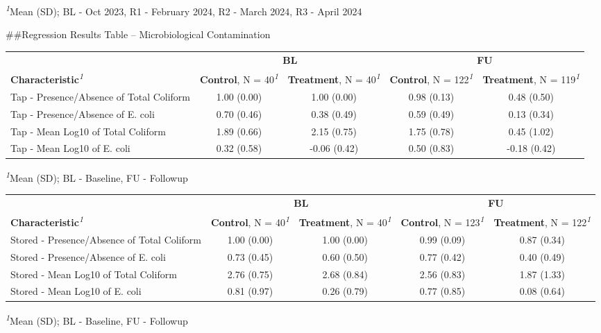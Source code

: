 \documentclass[
]{article}
\begin{document}
\begin{minipage}{\linewidth}
\textsuperscript{\textit{1}}Mean (SD); BL - Oct 2023, R1 - February 2024, R2 - March 2024, R3 - April 2024\\
\end{minipage}

\#\#Regression Results Table -- Microbiological Contamination

\setlength{\LTpost}{0mm}
\begin{longtable}{lcccc}
\toprule
 & \multicolumn{2}{c}{\textbf{BL}} & \multicolumn{2}{c}{\textbf{FU}} \\ 
\cmidrule(lr){2-3} \cmidrule(lr){4-5}
\textbf{Characteristic}\textsuperscript{\textit{1}} & \textbf{Control}, N = 40\textsuperscript{\textit{1}} & \textbf{Treatment}, N = 40\textsuperscript{\textit{1}} & \textbf{Control}, N = 122\textsuperscript{\textit{1}} & \textbf{Treatment}, N = 119\textsuperscript{\textit{1}} \\ 
\midrule\addlinespace[2.5pt]
Tap - Presence/Absence of Total Coliform & 1.00 (0.00) & 1.00 (0.00) & 0.98 (0.13) & 0.48 (0.50) \\ 
Tap - Presence/Absence of E. coli & 0.70 (0.46) & 0.38 (0.49) & 0.59 (0.49) & 0.13 (0.34) \\ 
Tap - Mean Log10 of Total Coliform & 1.89 (0.66) & 2.15 (0.75) & 1.75 (0.78) & 0.45 (1.02) \\ 
Tap - Mean Log10 of E. coli & 0.32 (0.58) & -0.06 (0.42) & 0.50 (0.83) & -0.18 (0.42) \\ 
\bottomrule
\end{longtable}
\begin{minipage}{\linewidth}
\textsuperscript{\textit{1}}Mean (SD); BL - Baseline, FU - Followup\\
\end{minipage}
\setlength{\LTpost}{0mm}
\begin{longtable}{lcccc}
\toprule
 & \multicolumn{2}{c}{\textbf{BL}} & \multicolumn{2}{c}{\textbf{FU}} \\ 
\cmidrule(lr){2-3} \cmidrule(lr){4-5}
\textbf{Characteristic}\textsuperscript{\textit{1}} & \textbf{Control}, N = 40\textsuperscript{\textit{1}} & \textbf{Treatment}, N = 40\textsuperscript{\textit{1}} & \textbf{Control}, N = 123\textsuperscript{\textit{1}} & \textbf{Treatment}, N = 122\textsuperscript{\textit{1}} \\ 
\midrule\addlinespace[2.5pt]
Stored - Presence/Absence of Total Coliform & 1.00 (0.00) & 1.00 (0.00) & 0.99 (0.09) & 0.87 (0.34) \\ 
Stored - Presence/Absence of E. coli & 0.73 (0.45) & 0.60 (0.50) & 0.77 (0.42) & 0.40 (0.49) \\ 
Stored - Mean Log10 of Total Coliform & 2.76 (0.75) & 2.68 (0.84) & 2.56 (0.83) & 1.87 (1.33) \\ 
Stored - Mean Log10 of E. coli & 0.81 (0.97) & 0.26 (0.79) & 0.77 (0.85) & 0.08 (0.64) \\ 
\bottomrule
\end{longtable}
\begin{minipage}{\linewidth}
\textsuperscript{\textit{1}}Mean (SD); BL - Baseline, FU - Followup\\
\end{minipage}
\end{document}
